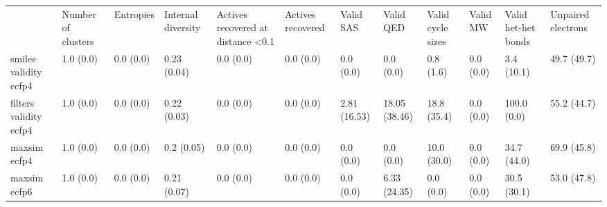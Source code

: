 \begin{tabular}{llllllllllll}
 & Number of clusters & Entropies & Internal diversity & Actives recovered at distance <0.1 & Actives recovered & Valid SAS & Valid QED & Valid cycle sizes & Valid MW & Valid het-het bonds & Unpaired electrons \\
smiles validity ecfp4 & {\cellcolor[HTML]{F6FCFD}} \color[HTML]{000000} 1.0 (0.0) & {\cellcolor[HTML]{F7FCFD}} \color[HTML]{000000} 0.0 (0.0) & {\cellcolor[HTML]{D1EEE9}} \color[HTML]{000000} 0.23 (0.04) & {\cellcolor[HTML]{F7FCFD}} \color[HTML]{000000} 0.0 (0.0) & {\cellcolor[HTML]{F7FCFD}} \color[HTML]{000000} 0.0 (0.0) & {\cellcolor[HTML]{F7FCFD}} \color[HTML]{000000} 0.0 (0.0) & {\cellcolor[HTML]{F7FCFD}} \color[HTML]{000000} 0.0 (0.0) & {\cellcolor[HTML]{F6FCFD}} \color[HTML]{000000} 0.8 (1.6) & {\cellcolor[HTML]{F7FCFD}} \color[HTML]{000000} 0.0 (0.0) & {\cellcolor[HTML]{F2FAFC}} \color[HTML]{000000} 3.4 (10.1) & {\cellcolor[HTML]{67C2A5}} \color[HTML]{000000} 49.7 (49.7) \\
filters validity ecfp4 & {\cellcolor[HTML]{F6FCFD}} \color[HTML]{000000} 1.0 (0.0) & {\cellcolor[HTML]{F7FCFD}} \color[HTML]{000000} 0.0 (0.0) & {\cellcolor[HTML]{D3EEEB}} \color[HTML]{000000} 0.22 (0.03) & {\cellcolor[HTML]{F7FCFD}} \color[HTML]{000000} 0.0 (0.0) & {\cellcolor[HTML]{F7FCFD}} \color[HTML]{000000} 0.0 (0.0) & {\cellcolor[HTML]{F3FAFC}} \color[HTML]{000000} 2.81 (16.53) & {\cellcolor[HTML]{DAF1F1}} \color[HTML]{000000} 18.05 (38.46) & {\cellcolor[HTML]{D8F0EF}} \color[HTML]{000000} 18.8 (35.4) & {\cellcolor[HTML]{F7FCFD}} \color[HTML]{000000} 0.0 (0.0) & {\cellcolor[HTML]{00441B}} \color[HTML]{F1F1F1} 100.0 (0.0) & {\cellcolor[HTML]{56BA91}} \color[HTML]{F1F1F1} 55.2 (44.7) \\
maxsim ecfp4 & {\cellcolor[HTML]{F6FCFD}} \color[HTML]{000000} 1.0 (0.0) & {\cellcolor[HTML]{F7FCFD}} \color[HTML]{000000} 0.0 (0.0) & {\cellcolor[HTML]{D7F0EE}} \color[HTML]{000000} 0.2 (0.05) & {\cellcolor[HTML]{F7FCFD}} \color[HTML]{000000} 0.0 (0.0) & {\cellcolor[HTML]{F7FCFD}} \color[HTML]{000000} 0.0 (0.0) & {\cellcolor[HTML]{F7FCFD}} \color[HTML]{000000} 0.0 (0.0) & {\cellcolor[HTML]{F7FCFD}} \color[HTML]{000000} 0.0 (0.0) & {\cellcolor[HTML]{E9F7FA}} \color[HTML]{000000} 10.0 (30.0) & {\cellcolor[HTML]{F7FCFD}} \color[HTML]{000000} 0.0 (0.0) & {\cellcolor[HTML]{A5DDD0}} \color[HTML]{000000} 34.7 (44.0) & {\cellcolor[HTML]{2F9858}} \color[HTML]{F1F1F1} 69.9 (45.8) \\
maxsim ecfp6 & {\cellcolor[HTML]{F5FBFD}} \color[HTML]{000000} 1.0 (0.0) & {\cellcolor[HTML]{F7FCFD}} \color[HTML]{000000} 0.0 (0.0) & {\cellcolor[HTML]{D5EFED}} \color[HTML]{000000} 0.21 (0.07) & {\cellcolor[HTML]{F7FCFD}} \color[HTML]{000000} 0.0 (0.0) & {\cellcolor[HTML]{F7FCFD}} \color[HTML]{000000} 0.0 (0.0) & {\cellcolor[HTML]{F7FCFD}} \color[HTML]{000000} 0.0 (0.0) & {\cellcolor[HTML]{EEF8FB}} \color[HTML]{000000} 6.33 (24.35) & {\cellcolor[HTML]{F7FCFD}} \color[HTML]{000000} 0.0 (0.0) & {\cellcolor[HTML]{F7FCFD}} \color[HTML]{000000} 0.0 (0.0) & {\cellcolor[HTML]{B5E3D9}} \color[HTML]{000000} 30.5 (30.1) & {\cellcolor[HTML]{5DBD99}} \color[HTML]{000000} 53.0 (47.8) \\

\end{tabular}
